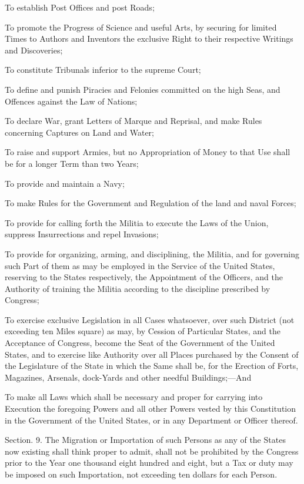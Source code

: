 \documentclass{article}
\begin{document}
To establish Post Offices and post Roads;

To promote the Progress of Science and useful Arts, by securing for
limited Times to Authors and Inventors the exclusive Right to their
respective Writings and Discoveries;

To constitute Tribunals inferior to the supreme Court;

To define and punish Piracies and Felonies committed on the high Seas,
and Offences against the Law of Nations;

To declare War, grant Letters of Marque and Reprisal, and make Rules
concerning Captures on Land and Water;

To raise and support Armies, but no Appropriation of Money to that Use
shall be for a longer Term than two Years;

To provide and maintain a Navy;

To make Rules for the Government and Regulation of the land and naval
Forces;

To provide for calling forth the Militia to execute the Laws of the
Union, suppress Insurrections and repel Invasions;

To provide for organizing, arming, and disciplining, the Militia, and
for governing such Part of them as may be employed in the Service of the
United States, reserving to the States respectively, the Appointment of
the Officers, and the Authority of training the Militia according to the
discipline prescribed by Congress;

To exercise exclusive Legislation in all Cases whatsoever, over such
District (not exceeding ten Miles square) as may, by Cession of
Particular States, and the Acceptance of Congress, become the Seat of
the Government of the United States, and to exercise like Authority over
all Places purchased by the Consent of the Legislature of the State in
which the Same shall be, for the Erection of Forts, Magazines, Arsenals,
dock-Yards and other needful Buildings;—And

To make all Laws which shall be necessary and proper for carrying into
Execution the foregoing Powers and all other Powers vested by this
Constitution in the Government of the United States, or in any
Department or Officer thereof.

Section. 9.  The Migration or Importation of such Persons as any of the
States now existing shall think proper to admit, shall not be prohibited
by the Congress prior to the Year one thousand eight hundred and eight,
but a Tax or duty may be imposed on such Importation, not exceeding ten
dollars for each Person.
\end{document}
